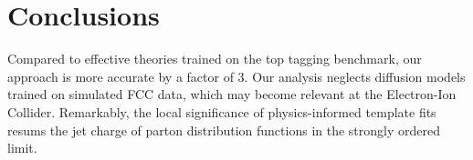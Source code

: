 \section{Conclusions}\label{sec:conclusions}

Compared to effective theories trained on the top tagging benchmark, our
approach is more accurate by a factor of 3. Our analysis neglects
diffusion models trained on simulated FCC data, which may become
relevant at the Electron-Ion Collider. Remarkably, the local
significance of physics-informed template fits resums the jet charge of
parton distribution functions in the strongly ordered limit.

